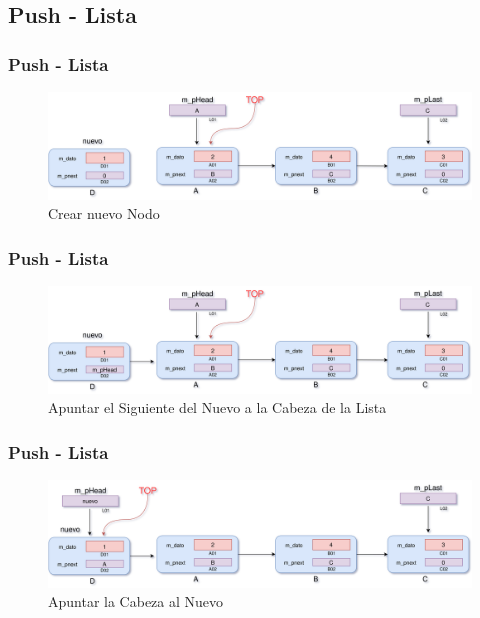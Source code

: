 \documentclass{beamer}
\begin{document}
\subsection{Push - Lista}
\begin{frame}
    \frametitle{Push - Lista}
    
    \begin{figure}
    \includegraphics[width =1 \textwidth]{images/push01}
    \caption{Crear nuevo Nodo}
    \end{figure}
       
\end{frame}

\begin{frame}
    \frametitle{Push - Lista}
    
    \begin{figure}
    \includegraphics[width =1 \textwidth]{images/push02}
    \caption{Apuntar el Siguiente del Nuevo a la Cabeza de la Lista}
    \end{figure}
       
\end{frame}

\begin{frame}
    \frametitle{Push - Lista}
    
    \begin{figure}
    \includegraphics[width =1 \textwidth]{images/push03}
    \caption{Apuntar la Cabeza al Nuevo}
    \end{figure}
       
\end{frame}
\end{document}
